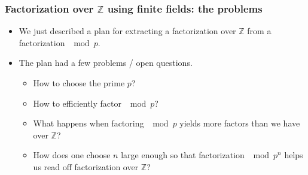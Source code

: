 \begin{frame}
\frametitle{Factorization over $\mathbb Z$ using finite fields: the problems}
\begin{itemize}
\item We just described a plan for extracting a factorization over $\mathbb Z$ from a factorization $\mod p$.
\item The plan had a few problems / open questions.
\begin{itemize}
\item How to choose the prime $p$?
\item \alert<1->{How to efficiently factor $\mod p$?}
\item What happens when factoring $\mod p$ yields more factors than we have over $\mathbb Z$?
\item How does one choose $n$ large enough so that factorization $\mod p^n$ helps us read off factorization over $\mathbb Z$?
\end{itemize}
\end{itemize}
\end{frame}